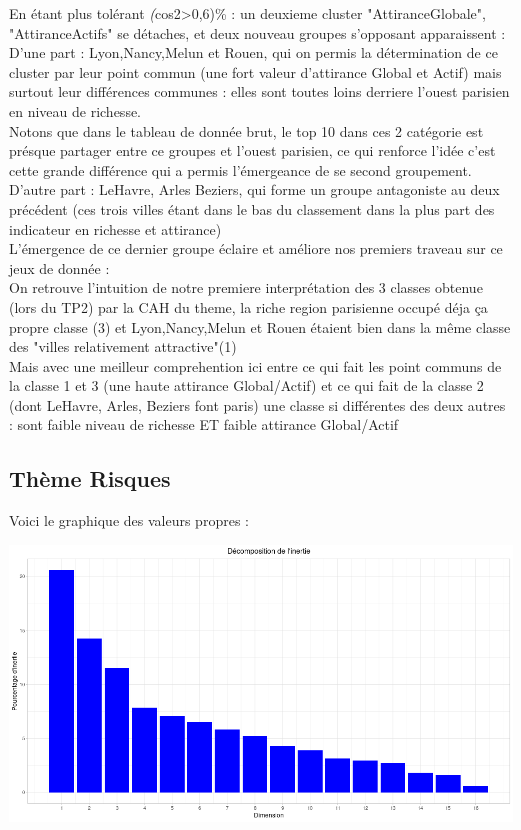 \documentclass{article}
\begin{document}
En étant plus tolérant \emph(cos2>0,6)\% : un deuxieme cluster  "AttiranceGlobale", "AttiranceActifs" se détaches, et deux nouveau groupes s'opposant apparaissent :\\
D'une part : Lyon,Nancy,Melun et Rouen, qui on permis la détermination de ce cluster par leur point commun (une fort valeur d'attirance Global et Actif) mais surtout leur différences communes : elles sont toutes loins derriere l'ouest parisien en niveau de richesse.\\
Notons que dans le tableau de donnée brut, le top 10 dans ces 2 catégorie est présque partager entre ce groupes et l'ouest parisien, ce qui renforce l'idée c'est cette grande différence qui a permis l'émergeance de se second groupement.\\
D'autre part : LeHavre, Arles Beziers, qui forme un groupe antagoniste au deux précédent (ces trois villes étant dans le bas du classement dans la plus part des indicateur en richesse et attirance)\\

L'émergence de ce dernier groupe éclaire et améliore nos premiers traveau sur ce jeux de donnée :\\
On retrouve l'intuition de notre premiere interprétation des 3 classes obtenue (lors du TP2) par la CAH du theme, la riche region parisienne occupé déja ça propre classe (3) et
Lyon,Nancy,Melun et Rouen étaient bien dans la même classe des "villes relativement attractive"(1)\\

Mais avec une meilleur comprehention ici entre ce qui fait les point communs de la classe 1 et 3 (une haute attirance Global/Actif)
et ce qui fait de la classe 2 (dont LeHavre, Arles, Beziers font paris) une classe si différentes des deux autres : sont faible niveau de richesse ET faible attirance Global/Actif\\

\subsection{Thème Risques}

Voici le graphique des valeurs propres :

\centerline{\includegraphics[width=0.8\linewidth]{images/ACP_ris_vp}}
\end{document}
